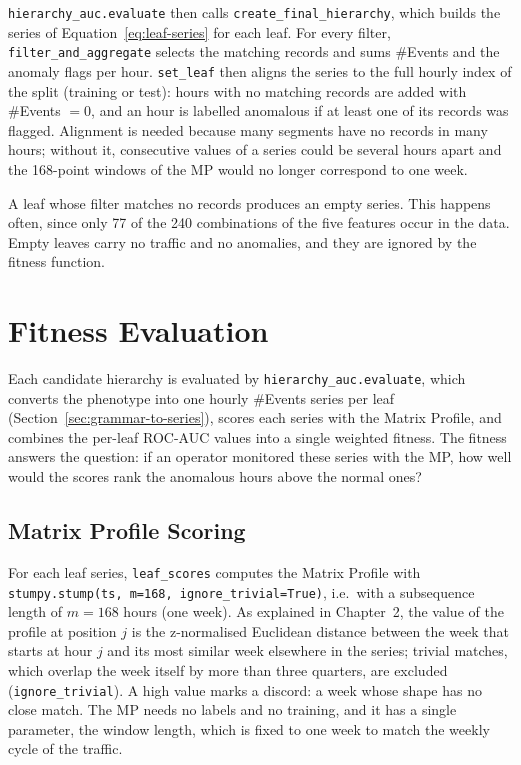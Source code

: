 \texttt{hierarchy\_auc.evaluate} then calls \texttt{create\_final\_hierarchy}, which builds the series of Equation~\eqref{eq:leaf-series} for each leaf.
For every filter, \texttt{filter\_and\_aggregate} selects the matching records and sums \#Events and the anomaly flags per hour.
\texttt{set\_leaf} then aligns the series to the full hourly index of the split (training or test): hours with no matching records are added with \#Events $= 0$, and an hour is labelled anomalous if at least one of its records was flagged.
Alignment is needed because many segments have no records in many hours; without it, consecutive values of a series could be several hours apart and the 168-point windows of the \ac{MP} would no longer correspond to one week.

A leaf whose filter matches no records produces an empty series.
This happens often, since only 77 of the 240 combinations of the five features occur in the data.
Empty leaves carry no traffic and no anomalies, and they are ignored by the fitness function.

\section{Fitness Evaluation}
\label{sec:fitness-evaluation}

Each candidate hierarchy is evaluated by \texttt{hierarchy\_auc.evaluate}, which converts the phenotype into one hourly \#Events series per leaf (Section~\ref{sec:grammar-to-series}), scores each series with the Matrix Profile, and combines the per-leaf ROC-AUC values into a single weighted fitness.
The fitness answers the question: if an operator monitored these series with the \ac{MP}, how well would the scores rank the anomalous hours above the normal ones?

\subsection{Matrix Profile Scoring}

For each leaf series, \texttt{leaf\_scores} computes the Matrix Profile with \texttt{stumpy.stump(ts, m=168, ignore\_trivial=True)}, i.e.\ with a subsequence length of $m = 168$ hours (one week).
As explained in Chapter~2, the value of the profile at position $j$ is the z-normalised Euclidean distance between the week that starts at hour $j$ and its most similar week elsewhere in the series; trivial matches, which overlap the week itself by more than three quarters, are excluded (\texttt{ignore\_trivial}).
A high value marks a discord: a week whose shape has no close match.
The \ac{MP} needs no labels and no training, and it has a single parameter, the window length, which is fixed to one week to match the weekly cycle of the traffic.

